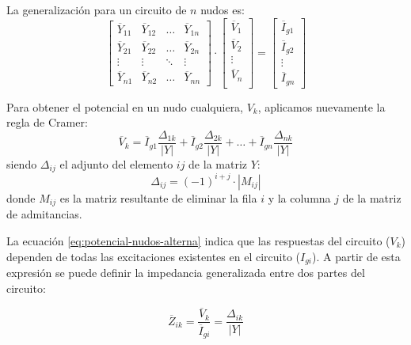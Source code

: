 La generalización para un circuito de $n$ nudos es:
\begin{equation*}
  \begin{bmatrix}
    \overline{Y}_{11} & \overline{Y}_{12} & \dots & \overline{Y}_{1n} \\
    \overline{Y}_{21} & \overline{Y}_{22} & \dots & \overline{Y}_{2n} \\
    \vdots & \vdots & \ddots & \vdots \\
    \overline{Y}_{n1} & \overline{Y}_{n2} &  \dots & \overline{Y}_{nn}
  \end{bmatrix} \cdot %
  \begin{bmatrix}
    \overline{V}_1\\
    \overline{V}_2\\
    \vdots \\
    \overline{V}_n\\
  \end{bmatrix} = %
  \begin{bmatrix}
    \overline{I}_{g1}\\
    \overline{I}_{g2}\\
    \vdots \\
    \overline{I}_{gn}
  \end{bmatrix}
\end{equation*}

Para obtener el potencial en un nudo cualquiera, $V_k$, aplicamos
nuevamente la regla de Cramer:
\begin{equation}
  \label{eq:potencial-nudos-alterna}
  \overline{V}_k = \overline{I}_{g1} \frac{\Delta_{1k}}{|Y|} + \overline{I}_{g2} \frac{\Delta_{2k}}{|Y|} + \dots + \overline{I}_{gn} \frac{\Delta_{nk}}{|Y|}
\end{equation}
siendo \(\Delta_{ij}\) el adjunto del elemento \(ij\) de la matriz
\(Y\):
\[
  \Delta_{ij} = (-1)^{i+j} \cdot |M_{ij}|
\]
donde \(M_{ij}\) es la matriz resultante de eliminar la fila \(i\) y
la columna \(j\) de la matriz de admitancias.

La ecuación \ref{eq:potencial-nudos-alterna} indica que las respuestas
del circuito (\(V_k\)) dependen de todas las excitaciones existentes
en el circuito (\(I_{gi}\)). A partir de esta expresión se puede
definir la impedancia generalizada entre dos partes del circuito:

\begin{equation}
  \label{eq:impedancia-generalizada}
  \overline{Z}_{ik} = \frac{\overline{V}_k}{\overline{I}_{gi}} = \frac{\Delta_{ik}}{|Y|}
\end{equation}

